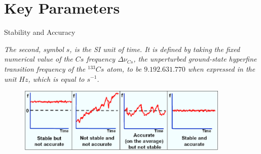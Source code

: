 \section{Key Parameters}

\begin{frame}{Stability and Accuracy}

    \textit{
        The second, symbol $s$, is the SI unit of time.
        It is defined by taking the fixed numerical value of the $Cs$ frequency $\Delta \nu_{Cs}$, the unperturbed ground-state hyperfine transition frequency of the $^{133}Cs$ atom, to be $9.192.631.770$ when expressed in the unit $Hz$, which is equal to $s^{-1}$.
    }

    \begin{figure}
        \centering
        \includegraphics[width=0.9\textwidth]{img/stability-accuracy.png}
    \end{figure}

\end{frame}



